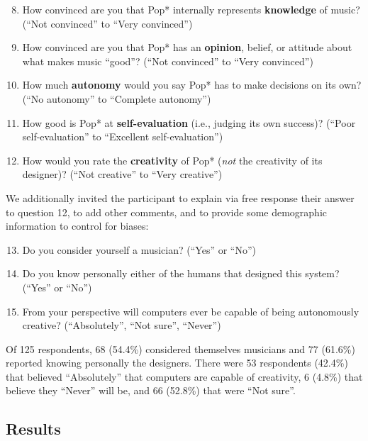 \documentclass[phd,electronic,oneside,twosidetoc,letterpaper,chaptercenter,parttop,lol,lof,lot]{byumsphd}
\begin{document}
\begin{enumerate}
  \setcounter{enumi}{7}
\item How convinced are you that Pop* internally represents \textbf{knowledge} of music? (``Not convinced''	to ``Very convinced'')
\item How convinced are you that Pop* has an \textbf{opinion}, belief, or attitude about what makes music ``good''? (``Not convinced'' to ``Very convinced'')
\item How much \textbf{autonomy} would you say Pop* has to make decisions on its own? (``No autonomy'' to ``Complete autonomy'')
\item How good is Pop* at \textbf{self-evaluation} (i.e., judging its own success)? (``Poor self-evaluation'' to ``Excellent self-evaluation'')
\item How would you rate the \textbf{creativity} of Pop* (\textit{not} the creativity of its designer)? (``Not creative'' to ``Very creative'')
\end{enumerate}

We additionally invited the participant to explain via free response their answer to question 12, to add other comments, and to provide some demographic information to control for biases:

\begin{enumerate}
  \setcounter{enumi}{12}
\item Do you consider yourself a musician? (``Yes'' or ``No'')
\item Do you know personally either of the humans that designed this system? (``Yes'' or ``No'')
\item From your perspective will computers ever be capable of being autonomously creative?  (``Absolutely'', ``Not sure'', ``Never'')
\end{enumerate}

Of 125 respondents, 68 (54.4\%) considered themselves musicians and 77 (61.6\%) reported knowing personally the designers. There were 53 respondents (42.4\%) that believed ``Absolutely'' that computers are capable of creativity, 6 (4.8\%) that believe they ``Never'' will be, and 66 (52.8\%) that were ``Not sure''.

\subsection{Results}
\end{document}
